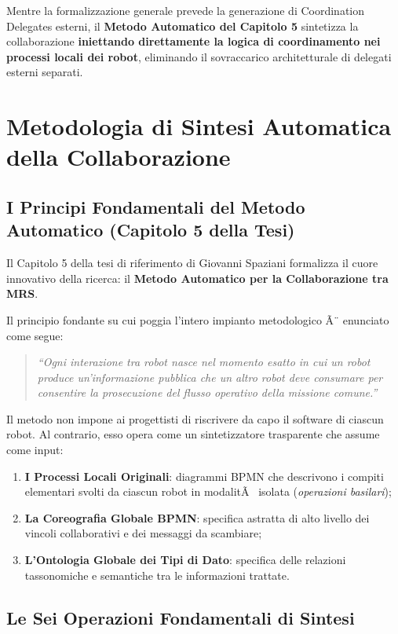 ﻿\documentclass[11pt, a4paper]{report}
\begin{document}
Mentre la formalizzazione generale prevede la generazione di Coordination Delegates esterni, il \textbf{Metodo Automatico del Capitolo 5} sintetizza la collaborazione \textbf{iniettando direttamente la logica di coordinamento nei processi locali dei robot}, eliminando il sovraccarico architetturale di delegati esterni separati.


\chapter{Metodologia di Sintesi Automatica della Collaborazione}

\section{I Principi Fondamentali del Metodo Automatico (Capitolo 5 della Tesi)}

Il Capitolo 5 della tesi di riferimento di Giovanni Spaziani formalizza il cuore innovativo della ricerca: il \textbf{Metodo Automatico per la Collaborazione tra MRS}.

Il principio fondante su cui poggia l'intero impianto metodologico Ã¨ enunciato come segue:

\begin{quote}
\textit{``Ogni interazione tra robot nasce nel momento esatto in cui un robot produce un'informazione pubblica che un altro robot deve consumare per consentire la prosecuzione del flusso operativo della missione comune.''}
\end{quote}

Il metodo non impone ai progettisti di riscrivere da capo il software di ciascun robot. Al contrario, esso opera come un sintetizzatore trasparente che assume come input:
\begin{enumerate}
    \item \textbf{I Processi Locali Originali}: diagrammi BPMN che descrivono i compiti elementari svolti da ciascun robot in modalitÃ  isolata (\textit{operazioni basilari});
    \item \textbf{La Coreografia Globale BPMN}: specifica astratta di alto livello dei vincoli collaborativi e dei messaggi da scambiare;
    \item \textbf{L'Ontologia Globale dei Tipi di Dato}: specifica delle relazioni tassonomiche e semantiche tra le informazioni trattate.
\end{enumerate}

\section{Le Sei Operazioni Fondamentali di Sintesi}
\end{document}
